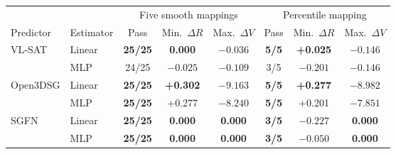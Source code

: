 \begin{minipage}{\textwidth}
\centering
{\small
\setlength{\tabcolsep}{3.5pt}
\begin{tabular}{llccc|ccc}
\toprule
& & \multicolumn{3}{c}{Five smooth mappings} &
\multicolumn{3}{c}{Percentile mapping} \\
\cmidrule(lr){3-5}\cmidrule(lr){6-8}
Predictor & Estimator & Pass & Min.\ \(\Delta R\) & Max.\ \(\Delta V\) &
Pass & Min.\ \(\Delta R\) & Max.\ \(\Delta V\) \\
\midrule
\multirow{2}{*}{VL-SAT}
 & Linear & \textbf{25/25} & \textbf{0.000} & $-0.036$ & \textbf{5/5} & \textbf{+0.025} & $\mathbf{-0.146}$ \\
 & MLP    & 24/25 & $-0.025$ & $\mathbf{-0.109}$ & 3/5 & $-0.201$ & $\mathbf{-0.146}$ \\
\midrule
\multirow{2}{*}{Open3DSG}
 & Linear & \textbf{25/25} & \textbf{+0.302} & $\mathbf{-9.163}$ & \textbf{5/5} & \textbf{+0.277} & $\mathbf{-8.982}$ \\
 & MLP    & \textbf{25/25} & +0.277 & $-8.240$ & \textbf{5/5} & +0.201 & $-7.851$ \\
\midrule
\multirow{2}{*}{SGFN}
 & Linear & \textbf{25/25} & \textbf{0.000} & \textbf{0.000} & \textbf{3/5} & $-0.227$ & \textbf{0.000} \\
 & MLP    & \textbf{25/25} & \textbf{0.000} & \textbf{0.000} & \textbf{3/5} & $\mathbf{-0.050}$ & \textbf{0.000} \\
\bottomrule
\end{tabular}
}
\label{tab:score-mapping-sensitivity}
\end{minipage}

